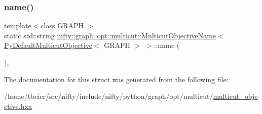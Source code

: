 \subsubsection{\texorpdfstring{name()}{name()}}
{\footnotesize\ttfamily template$<$class G\+R\+A\+PH $>$ \\
static std\+::string \hyperlink{structnifty_1_1graph_1_1opt_1_1multicut_1_1MulticutObjectiveName}{nifty\+::graph\+::opt\+::multicut\+::\+Multicut\+Objective\+Name}$<$ \hyperlink{namespacenifty_1_1graph_1_1opt_1_1multicut_a7dbb5a757325e1a3bdf7e8ed21168986}{Py\+Default\+Multicut\+Objective}$<$ G\+R\+A\+PH $>$ $>$\+::name (\begin{DoxyParamCaption}{ }\end{DoxyParamCaption})\hspace{0.3cm}{\ttfamily [inline]}, {\ttfamily [static]}}



The documentation for this struct was generated from the following file\+:\begin{DoxyCompactItemize}
\item 
/home/tbeier/src/nifty/include/nifty/python/graph/opt/multicut/\hyperlink{python_2graph_2opt_2multicut_2multicut__objective_8hxx}{multicut\+\_\+objective.\+hxx}\end{DoxyCompactItemize}
